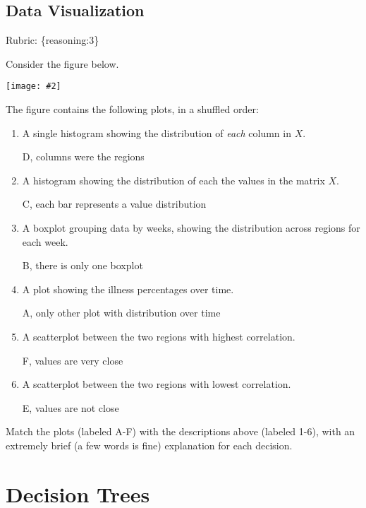 \documentclass{article}
\def\rubric#1{\gre{Rubric: \{#1\}}}{}
\def\blu#1{{\color{blu}#1}}
\def\gre#1{{\color{gre}#1}}
\newcommand{\fig}[2]{\texttt{[image: \#2]}}
\def\enum#1{\begin{enumerate}#1\end{enumerate}}
\begin{document}
\begin{enumerate}
\subsection{Data Visualization}
\rubric{reasoning:3}

Consider the figure below.

\fig{1}{../figs/visualize-unlabeled}

The figure contains the following plots, in a shuffled order:
\enum{
\item A single histogram showing the distribution of \emph{each} column in $X$.
\begin{center}\color{blu} D, columns were the regions  \end{center}
\item A histogram showing the distribution of each the values in the matrix $X$.
\begin{center}\color{blu} C, each bar represents a value distribution  \end{center}
\item A boxplot grouping data by weeks, showing the distribution across regions for each week.
\begin{center}\color{blu} B, there is only one boxplot\end{center}
\item A plot showing the illness percentages over time.
\begin{center}\color{blu} A, only other plot with distribution over time \end{center}
\item A scatterplot between the two regions with highest correlation.
\begin{center}\color{blu} F, values are very close  \end{center}
\item A scatterplot between the two regions with lowest correlation.
\begin{center}\color{blu} E, values are not close  \end{center}
}

\blu{Match the plots (labeled A-F) with the descriptions above (labeled 1-6), with an extremely brief (a few words is fine) explanation for each decision.}



\section{Decision Trees}


\end{enumerate}
\end{document}
